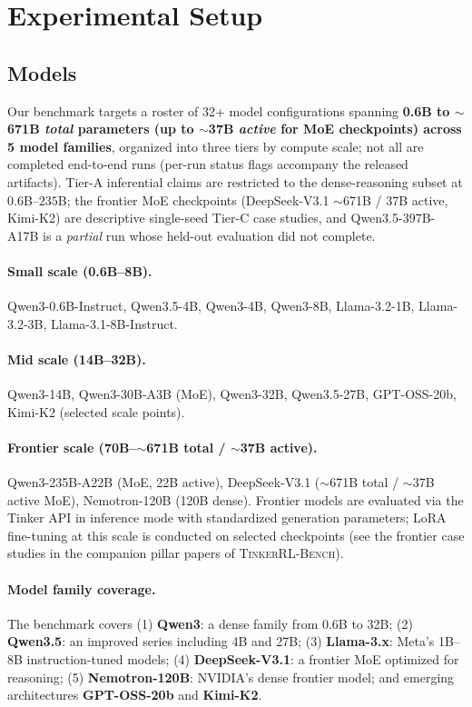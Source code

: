 \documentclass{article}  \usepackage[preprint,nonatbib]{neurips_2026} \usepackage[numbers]{natbib}
\newcommand{\ours}{\textsc{TinkerRL-Bench}}
\begin{document}
\section{Experimental Setup}
\label{sec:setup}


\subsection{Models}

Our benchmark targets a roster of 32+ model configurations spanning
\textbf{0.6B to $\sim$671B \emph{total} parameters (up to $\sim$37B \emph{active}
for MoE checkpoints) across 5 model families}, organized into three
tiers by compute scale; not all are completed end-to-end runs (per-run
status flags accompany the released artifacts). Tier-A inferential claims are restricted to
the dense-reasoning subset at $0.6$B--$235$B; the frontier MoE
checkpoints (DeepSeek-V3.1 $\sim$671B / 37B active, Kimi-K2) are
descriptive single-seed Tier-C case studies, and Qwen3.5-397B-A17B is a
\emph{partial} run whose held-out evaluation did not complete.

\paragraph{Small scale (0.6B--8B).}
Qwen3-0.6B-Instruct, Qwen3.5-4B, Qwen3-4B, Qwen3-8B,
Llama-3.2-1B, Llama-3.2-3B, Llama-3.1-8B-Instruct.

\paragraph{Mid scale (14B--32B).}
Qwen3-14B, Qwen3-30B-A3B (MoE), Qwen3-32B, Qwen3.5-27B,
GPT-OSS-20b, Kimi-K2 (selected scale points).

\paragraph{Frontier scale (70B--$\sim$671B total / $\sim$37B active).}
Qwen3-235B-A22B (MoE, 22B active), DeepSeek-V3.1 ($\sim$671B total /
$\sim$37B active MoE), Nemotron-120B (120B dense).
Frontier models are evaluated via the Tinker API in inference mode
with standardized generation parameters; LoRA fine-tuning at this
scale is conducted on selected checkpoints (see the frontier case studies
in the companion pillar papers of \ours{}).

\paragraph{Model family coverage.}
The benchmark covers (1) \textbf{Qwen3}: a dense family from 0.6B to 32B;
(2) \textbf{Qwen3.5}: an improved series including 4B and 27B;
(3) \textbf{Llama-3.x}: Meta's 1B--8B instruction-tuned models;
(4) \textbf{DeepSeek-V3.1}: a frontier MoE optimized for reasoning;
(5) \textbf{Nemotron-120B}: NVIDIA's dense frontier model;
and emerging architectures \textbf{GPT-OSS-20b} and \textbf{Kimi-K2}.
\end{document}
